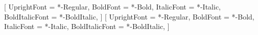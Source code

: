 %

\usepackage{xcolor}
\usepackage{fontspec}
\usepackage{graphicx}


\newif\ifuwdark
\uwdarkfalse   %

\setsansfont{Red Hat Display}[
  UprightFont    = *-Regular,
  BoldFont       = *-Bold,
  ItalicFont     = *-Italic,
  BoldItalicFont = *-BoldItalic,
]
\setmainfont{Red Hat Text}[
  UprightFont    = *-Regular,
  BoldFont       = *-Bold,
  ItalicFont     = *-Italic,
  BoldItalicFont = *-BoldItalic,
]



